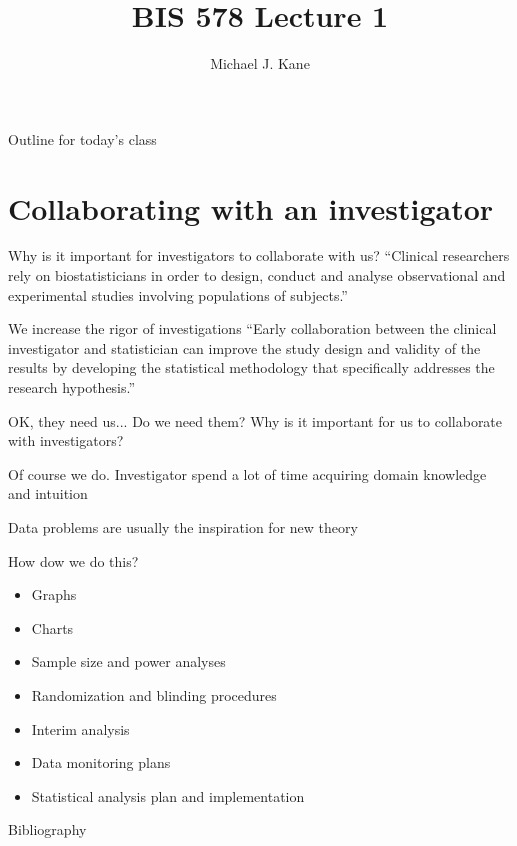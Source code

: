 \documentclass[13pt]{beamer}
\title{BIS 578 Lecture 1}
\author{Michael J. Kane}
\date{}
\begin{document}
\begin{frame}
  \titlepage
\end{frame}

\begin{frame}{Outline for today's class}
  \tableofcontents
\end{frame}

\section{Collaborating with an investigator}

\begin{frame}{Why is it important for investigators to collaborate with us?}
``Clinical researchers rely on biostatisticians in order to design, conduct and 
analyse observational and experimental studies involving populations of 
subjects.'' \citep{Bangdiwala2001}
\end{frame}

\begin{frame}{We increase the rigor of investigations}
``Early collaboration between the clinical investigator and statistician can 
improve the study design and validity of the results by developing the 
statistical methodology that specifically addresses the research hypothesis.''
\cite{Adams2009}
\end{frame}

\begin{frame}{OK, they need us...  Do we need them?}
Why is it important for us to collaborate with investigators?
\end{frame}

\begin{frame}{Of course we do.}
Investigator spend a lot of time acquiring domain knowledge and intuition

\vspace{0.5cm}

Data problems are usually the inspiration for new theory
\end{frame}

\begin{frame}
\end{frame}

\begin{frame}{How dow we do this?}
\begin{itemize}
\item Graphs
\item Charts
\item Sample size and power analyses
\item Randomization and blinding procedures
\item Interim analysis
\item Data monitoring plans
\item Statistical analysis plan and implementation
\end{itemize} 
\end{frame}

\begin{frame}[allowframebreaks]{Bibliography}


\end{frame}
\end{document}
